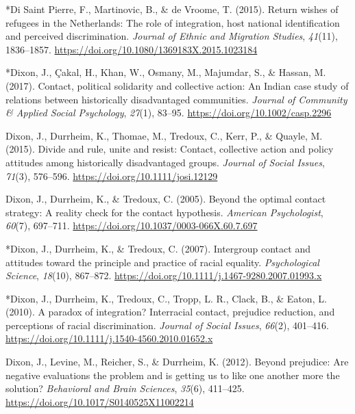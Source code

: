 \documentclass[12pt, letterpaper]{article}
\newenvironment{CSLReferences}[2]{}{}
\begin{document}
\begin{CSLReferences}{1}{0}
\leavevmode\hypertarget{ref-1807}{}%
*Di Saint Pierre, F., Martinovic, B., \& de Vroome, T. (2015). Return
wishes of refugees in the {Netherlands}: {The} role of integration, host
national identification and perceived discrimination. \emph{Journal of
Ethnic and Migration Studies}, \emph{41}(11), 1836--1857.
\url{https://doi.org/10.1080/1369183X.2015.1023184}

\leavevmode\hypertarget{ref-93}{}%
*Dixon, J., Çakal, H., Khan, W., Osmany, M., Majumdar, S., \& Hassan, M.
(2017). Contact, political solidarity and collective action: {An}
{Indian} case study of relations between historically disadvantaged
communities. \emph{Journal of Community \& Applied Social Psychology},
\emph{27}(1), 83--95. \url{https://doi.org/10.1002/casp.2296}

\leavevmode\hypertarget{ref-dixon_divide_2015}{}%
Dixon, J., Durrheim, K., Thomae, M., Tredoux, C., Kerr, P., \& Quayle,
M. (2015). Divide and rule, unite and resist: Contact, collective action
and policy attitudes among historically disadvantaged groups.
\emph{Journal of Social Issues}, \emph{71}(3), 576--596.
\url{https://doi.org/10.1111/josi.12129}

\leavevmode\hypertarget{ref-dixon_beyond_2005}{}%
Dixon, J., Durrheim, K., \& Tredoux, C. (2005). Beyond the optimal
contact strategy: A reality check for the contact hypothesis.
\emph{American Psychologist}, \emph{60}(7), 697--711.
\url{https://doi.org/10.1037/0003-066X.60.7.697}

\leavevmode\hypertarget{ref-1386}{}%
*Dixon, J., Durrheim, K., \& Tredoux, C. (2007). Intergroup contact and
attitudes toward the principle and practice of racial equality.
\emph{Psychological Science}, \emph{18}(10), 867--872.
\url{https://doi.org/10.1111/j.1467-9280.2007.01993.x}

\leavevmode\hypertarget{ref-336}{}%
*Dixon, J., Durrheim, K., Tredoux, C., Tropp, L. R., Clack, B., \&
Eaton, L. (2010). A paradox of integration? {Interracial} contact,
prejudice reduction, and perceptions of racial discrimination.
\emph{Journal of Social Issues}, \emph{66}(2), 401--416.
\url{https://doi.org/10.1111/j.1540-4560.2010.01652.x}

\leavevmode\hypertarget{ref-dixon_beyond_2012}{}%
Dixon, J., Levine, M., Reicher, S., \& Durrheim, K. (2012). Beyond
prejudice: {Are} negative evaluations the problem and is getting us to
like one another more the solution? \emph{Behavioral and Brain
Sciences}, \emph{35}(6), 411--425.
\url{https://doi.org/10.1017/S0140525X11002214}


\end{CSLReferences}
\end{document}
